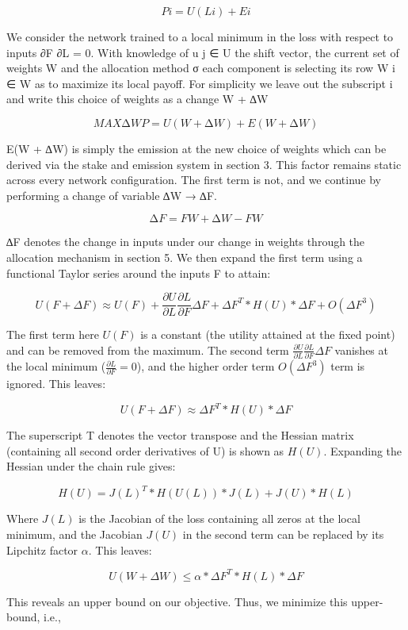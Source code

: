 \documentclass{article}
\begin{document}
\[P i = U(L i ) + E i \]

We consider the network trained to a local minimum in the loss with respect to inputs ∂F ∂L = 0. With knowledge of u j ∈ U the shift vector, the current set of weights W and the allocation method σ each component is selecting its row W i ∈ W as to maximize its local payoﬀ. For simplicity we leave out the subscript i and write this choice of weights as a change W + ∆W
\bigskip

\[MAX ∆W P = U(W + ∆W) + E(W + ∆W) \]

E(W + ∆W) is simply the emission at the new choice of weights which can be derived via the stake and emission system in section 3. This factor remains static across every network conﬁguration. The ﬁrst term is not, and we continue by performing a change of variable ∆W → ∆F.
\bigskip


\[∆F = F W +∆W − F W \]


∆F denotes the change in inputs under our change in weights through the allocation mechanism in section 5. We then expand the ﬁrst term using a functional Taylor series around the inputs F to attain:
\bigskip

\[ U(F + \Delta F) \approx U(F) + \frac{\partial U}{\partial L}\frac{\partial L}{\partial F} \Delta F  + \Delta F^T * H(U) * \Delta F + O(\Delta F^3)\]
\bigskip

The first term here $U(F)$ is a constant (the utility attained at the fixed point) and can be removed from the maximum. The second term $\frac{\partial U}{\partial L}\frac{\partial L}{\partial F} \Delta F$ vanishes at the local minimum ($\frac{\partial L}{\partial F} = 0$), and the higher order term $O(\Delta F^3)$ term is ignored. This leaves:
\bigskip

\[ U(F + \Delta F) \approx \Delta F^T *  H(U) * \Delta F\]

The superscript T denotes the vector transpose and the Hessian matrix (containing all second order derivatives of U) is shown as $H(U)$. Expanding the Hessian under the chain rule gives:
\bigskip

\[ H(U) = J(L)^T * H(U(L)) * J(L) + J(U) * H(L) \]

Where $J(L)$ is the Jacobian of the loss containing all zeros at the local minimum, and the Jacobian $J(U)$ in the second term can be replaced by its Lipchitz factor $\alpha$. This leaves:
\bigskip

\[ U(W + \Delta W) \leq \alpha * \Delta F^T * H(L) * \Delta F\]

This reveals an upper bound on our objective. Thus, we minimize this upper-bound, i.e.,
\end{document}
